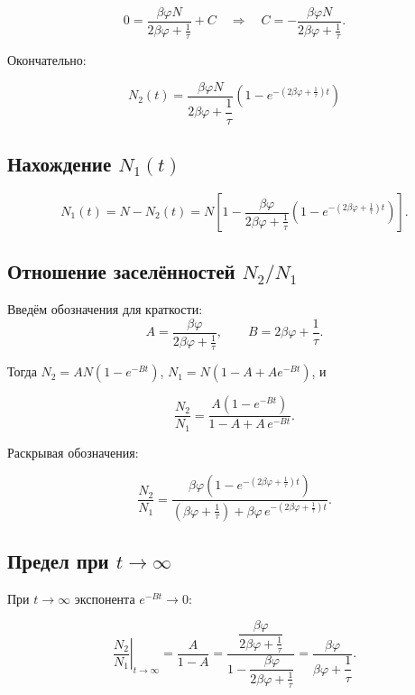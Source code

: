 \documentclass[12pt, a4paper]{article}
\begin{document}
\[
    0 = \frac{\beta\varphi N}{2\beta\varphi + \frac{1}{\tau}} + C \quad \Longrightarrow \quad C = -\frac{\beta\varphi N}{2\beta\varphi + \frac{1}{\tau}}.
\]

Окончательно:

\begin{equation}
    \boxed{N_2(t) = \frac{\beta\varphi N}{2\beta\varphi + \dfrac{1}{\tau}}\left(1 - e^{-\left(2\beta\varphi + \frac{1}{\tau}\right)t}\right)}
\end{equation}

\subsection*{Нахождение $N_1(t)$}

\[
    N_1(t) = N - N_2(t) = N\left[1 - \frac{\beta\varphi}{2\beta\varphi + \frac{1}{\tau}}\left(1 - e^{-\left(2\beta\varphi + \frac{1}{\tau}\right)t}\right)\right].
\]

\subsection*{Отношение заселённостей $N_2/N_1$}

Введём обозначения для краткости:
\[
    A = \frac{\beta\varphi}{2\beta\varphi + \frac{1}{\tau}}, \qquad B = 2\beta\varphi + \frac{1}{\tau}.
\]

Тогда $N_2 = AN\left(1 - e^{-Bt}\right)$, $N_1 = N\left(1 - A + A e^{-Bt}\right)$, и

\begin{equation}
    \frac{N_2}{N_1} = \frac{A\left(1 - e^{-Bt}\right)}{1 - A + A\,e^{-Bt}}.
\end{equation}

Раскрывая обозначения:

\begin{equation}
    \frac{N_2}{N_1} = \frac{\beta\varphi\left(1 - e^{-\left(2\beta\varphi + \frac{1}{\tau}\right)t}\right)}{\left(\beta\varphi + \frac{1}{\tau}\right) + \beta\varphi\, e^{-\left(2\beta\varphi + \frac{1}{\tau}\right)t}}.
\end{equation}

\subsection*{Предел при $t \to \infty$ }

При $t \to \infty$ экспонента $e^{-Bt} \to 0$:

\[
    \left.\frac{N_2}{N_1}\right|_{t\to\infty} = \frac{A}{1 - A} = \frac{\dfrac{\beta\varphi}{2\beta\varphi + \frac{1}{\tau}}}{1 - \dfrac{\beta\varphi}{2\beta\varphi + \frac{1}{\tau}}} = \frac{\beta\varphi}{\beta\varphi + \dfrac{1}{\tau}}.
\]
\end{document}
